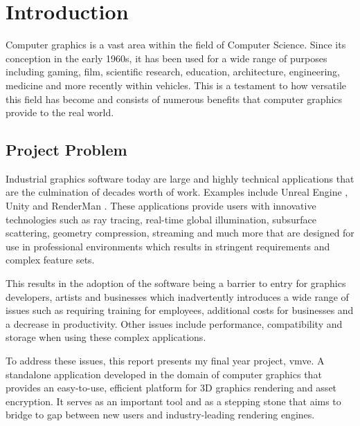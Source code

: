 \documentclass[11pt]{article}
\begin{document}
\pagebreak
{
  \hypersetup{linkcolor=black}
  \tableofcontents
}
\pagebreak

\clearpage
\printnoidxglossary[nonumberlist]

\clearpage
\printnoidxglossary[type=\acronymtype, nonumberlist]

\pagebreak
\pagestyle{fancy}

\section{Introduction}
Computer graphics is a vast area within the field of Computer Science. Since its
conception in the early 1960s, it has been used for a wide range of purposes
including gaming, film, scientific research, education, architecture,
engineering, medicine and more recently within vehicles. This is a testament to
how versatile this field has become and consists of numerous benefits that
computer graphics provide to the real world.

\subsection{Project Problem}
Industrial graphics software today are large and highly technical applications
that are the culmination of decades worth of work. Examples include Unreal
Engine \cite{unreal_engine}, Unity \cite{unity} and RenderMan \cite{render_man}.
These applications provide users with innovative technologies such as ray tracing,
real-time global illumination, subsurface scattering, geometry compression,
streaming and much more that are designed for use in professional environments
which results in stringent requirements and complex feature sets.

This results in the adoption of the software being a barrier to entry for
graphics developers, artists and businesses which inadvertently introduces a
wide range of issues such as requiring training for employees, additional costs
for businesses and a decrease in productivity. Other issues include performance,
compatibility and storage when using these complex applications.


To address these issues, this report presents my final year project,
\gls*{vmve}. A standalone application developed in the domain of computer
graphics that provides an easy-to-use, efficient platform for 3D graphics
rendering and asset encryption. It serves as an important tool and as a stepping
stone that aims to bridge to gap between new users and industry-leading
rendering engines.
\end{document}
